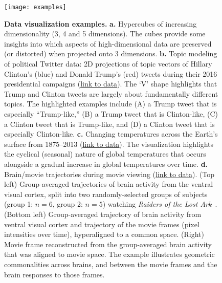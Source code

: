 \documentclass[twoside,11pt]{article}
\begin{document}
\begin{figure}[t]
\centering
\texttt{[image: examples]}
\caption{\small \textbf{Data visualization examples.} \textbf{a.} Hypercubes of increasing dimensionality (3, 4 and 5 dimensions).  The cubes provide some insights into which aspects of high-dimensional data are preserved (or distorted) when projected onto 3 dimensions.  \textbf{b.} Topic modeling~\citep{BleiEtal03} of political Twitter data: 2D projections of topic vectors of Hillary Clinton's (blue) and Donald Trump's (red) tweets during their 2016 presidential campaigns (\href{https://www.kaggle.com/benhamner/clinton-trump-tweets}{\underline{link to data}}).  The `V' shape highlights that Trump and Clinton tweets are largely about fundamentally different topics.  The highlighted examples include (A) a Trump tweet that is especially ``Trump-like,'' (B) a Trump tweet that is Clinton-like, (C) a Clinton tweet that is Trump-like, and (D) a Clinton tweet that is especially Clinton-like. \textbf{c.} Changing temperatures across the Earth's surface from 1875--2013 (\href{http://berkeleyearth.lbl.gov/city-list/}{\underline{link to data}}). The visualization highlights the cyclical (seasonal) nature of global temperatures that occurs alongside a gradual increase in global temperatures over time.  \textbf{d.} Brain/movie trajectories during movie viewing (\href{https://github.com/HaxbyLab/raiders_data}{\underline{link to data}}). (Top left) Group-averaged trajectories of brain activity from the ventral visual cortex, split into two randomly-selected groups of subjects (group 1: $n = 6$, group 2: $n = 5$) watching \textit{Raiders of the Lost Ark}~\citep{HaxbEtal11}. (Bottom left) Group-averaged trajectory of brain activity from ventral visual cortex and trajectory of the movie frames (pixel intensities over time), hyperaligned to a common space. (Right) Movie frame reconstructed from the group-averaged brain activity that was aligned to movie space.  The example illustrates geometric commonalities across brains, and between the movie frames and the brain responses to those frames.}
\label{fig:examples}
\end{figure}
\end{document}
